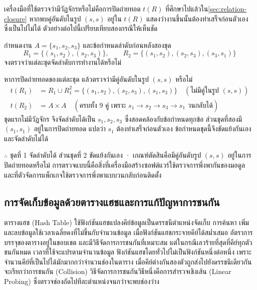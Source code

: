 เครื่องมือที่ใช้ตรวจว่ามีวัฏจักรหรือไม่คือการปิดถ่ายทอด $t(R)$ ที่ศึกษาไปแล้วใน\autoref{sec:relation-closure} หากพบคู่อันดับในรูป $(s,s)$ อยู่ใน $t(R)$ แสดงว่างานชิ้นนั้นต้องทำเสร็จก่อนตัวเอง ซึ่งเป็นไปไม่ได้ ตัวอย่างต่อไปนี้เปรียบเทียบสองกรณีให้เห็นชัด

\begin{ex}
\label{ex:precedence-cycle}
กำหนดงาน $A = \{s_1, s_2, s_3\}$ และข้อกำหนดลำดับก่อนหลังสองชุด
\[
R_1 = \{(s_1,s_2), (s_2,s_3)\}, \qquad R_2 = \{(s_1,s_2), (s_2,s_3), (s_3,s_1)\}
\]
จงตรวจว่าแต่ละชุดจัดลำดับการทำงานได้หรือไม่
\end{ex}
\begin{solution}
หาการปิดถ่ายทอดของแต่ละชุด แล้วตรวจว่ามีคู่อันดับในรูป $(s,s)$ หรือไม่
\begin{align*}
t(R_1) &= R_1 \cup R_1^2 = \{(s_1,s_2),(s_2,s_3),(s_1,s_3)\} \quad (\text{ไม่มีคู่ในรูป } (s,s))\\
t(R_2) &= A \times A \quad (\text{ครบทั้ง 9 คู่ เพราะ } s_1 \to s_2 \to s_3 \to s_1 \text{ วนกลับได้})
\end{align*}
ชุดแรกไม่มีวัฏจักร จึงจัดลำดับได้เป็น $s_1, s_2, s_3$ ซึ่งสอดคล้องกับข้อกำหนดทุกข้อ ส่วนชุดที่สองมี $(s_1,s_1)$ อยู่ในการปิดถ่ายทอด แปลว่า $s_1$ ต้องทำเสร็จก่อนตัวเอง ข้อกำหนดชุดนี้จึงขัดแย้งกันเองและจัดลำดับไม่ได้

$\therefore$ ชุดที่ 1 จัดลำดับได้ ส่วนชุดที่ 2 ขัดแย้งกันเอง · เกณฑ์ตัดสินคือมีคู่อันดับรูป $(s,s)$ อยู่ในการปิดถ่ายทอดหรือไม่ การตรวจแบบนี้คือสิ่งที่เครื่องมือสร้างซอฟต์แวร์ใช้ตรวจการพึ่งพากันของมอดูล และที่ตัวจัดการแพ็กเกจใช้ตรวจการพึ่งพาแบบวนกลับก่อนติดตั้ง \solhere
\end{solution}

\subsection{การจัดเก็บข้อมูลด้วยตารางแฮชและการแก้ปัญหาการชนกัน}
ตารางแฮช (Hash Table) ใช้ฟังก์ชันแฮชแปลงคีย์ข้อมูลเป็นดรรชนีตำแหน่งจัดเก็บ การค้นหา เพิ่ม และลบข้อมูลใช้เวลาเฉลี่ยคงที่ไม่ขึ้นกับจำนวนข้อมูล เมื่อฟังก์ชันแฮชกระจายคีย์ได้สม่ำเสมอ อัตราการบรรจุของตารางอยู่ในขอบเขต และมีวิธีจัดการการชนกันที่เหมาะสม แต่ในกรณีเลวร้ายที่สุดที่คีย์ทุกตัวชนกันหมด เวลาที่ใช้จะแปรตามจำนวนข้อมูล ฟังก์ชันแฮชโดยทั่วไปไม่เป็นฟังก์ชันหนึ่งต่อหนึ่ง เพราะจำนวนคีย์ที่เป็นไปได้มักมากกว่าจำนวนช่องในตาราง เมื่อคีย์ต่างกันสองตัวถูกส่งไปยังดรรชนีเดียวกันจะเรียกว่าการชนกัน (Collision) วิธีจัดการการชนกันวิธีหนึ่งคือการสำรวจเชิงเส้น (Linear Probing) ซึ่งตรวจช่องถัดไปทีละตำแหน่งจนกว่าจะพบช่องว่าง~\parencite{gersting2014structures}

